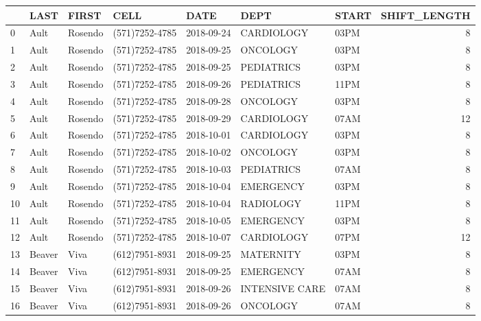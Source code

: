 \documentclass[11pt]{article}
\begin{document}
\begin{tabular}{lllllllr}
	\toprule
	{} &       LAST &    FIRST &            CELL &        DATE &            DEPT & START &  SHIFT\_LENGTH \\
	\midrule
	0  &       Ault &  Rosendo &  (571)7252-4785 &  2018-09-24 &      CARDIOLOGY &  03PM &             8 \\
	1  &       Ault &  Rosendo &  (571)7252-4785 &  2018-09-25 &        ONCOLOGY &  03PM &             8 \\
	2  &       Ault &  Rosendo &  (571)7252-4785 &  2018-09-25 &      PEDIATRICS &  03PM &             8 \\
	3  &       Ault &  Rosendo &  (571)7252-4785 &  2018-09-26 &      PEDIATRICS &  11PM &             8 \\
	4  &       Ault &  Rosendo &  (571)7252-4785 &  2018-09-28 &        ONCOLOGY &  03PM &             8 \\
	5  &       Ault &  Rosendo &  (571)7252-4785 &  2018-09-29 &      CARDIOLOGY &  07AM &            12 \\
	6  &       Ault &  Rosendo &  (571)7252-4785 &  2018-10-01 &      CARDIOLOGY &  03PM &             8 \\
	7  &       Ault &  Rosendo &  (571)7252-4785 &  2018-10-02 &        ONCOLOGY &  03PM &             8 \\
	8  &       Ault &  Rosendo &  (571)7252-4785 &  2018-10-03 &      PEDIATRICS &  07AM &             8 \\
	9  &       Ault &  Rosendo &  (571)7252-4785 &  2018-10-04 &       EMERGENCY &  03PM &             8 \\
	10 &       Ault &  Rosendo &  (571)7252-4785 &  2018-10-04 &       RADIOLOGY &  11PM &             8 \\
	11 &       Ault &  Rosendo &  (571)7252-4785 &  2018-10-05 &       EMERGENCY &  03PM &             8 \\
	12 &       Ault &  Rosendo &  (571)7252-4785 &  2018-10-07 &      CARDIOLOGY &  07PM &            12 \\
	13 &     Beaver &     Viva &  (612)7951-8931 &  2018-09-25 &       MATERNITY &  03PM &             8 \\
	14 &     Beaver &     Viva &  (612)7951-8931 &  2018-09-25 &       EMERGENCY &  07AM &             8 \\
	15 &     Beaver &     Viva &  (612)7951-8931 &  2018-09-26 &  INTENSIVE CARE &  07AM &             8 \\
	16 &     Beaver &     Viva &  (612)7951-8931 &  2018-09-26 &        ONCOLOGY &  07AM &             8 \\

\end{tabular}
\end{document}
